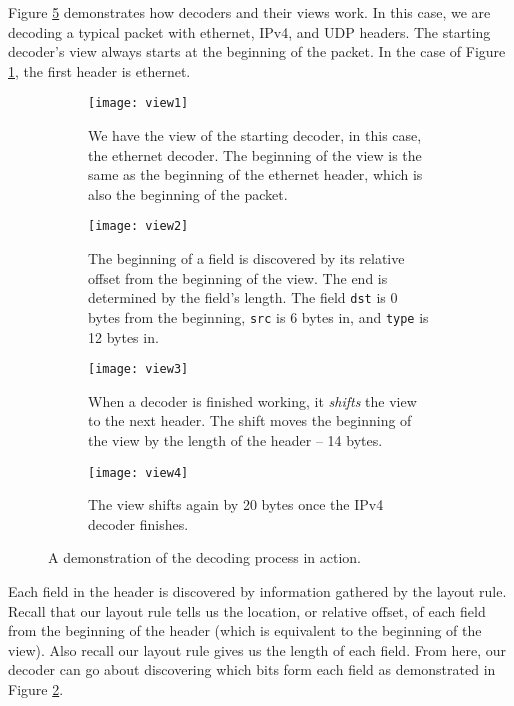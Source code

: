 Figure \ref{fg:decoding} demonstrates how decoders and their views work. In this case, we are decoding a typical packet with ethernet, IPv4, and UDP headers. The starting decoder's view always starts at the beginning of the packet. In the case of Figure \ref{fg:view1}, the first header is ethernet.

\begin{figure}[ht]
\begin{subfigure}[t]{.45\textwidth}
  \centering
  \texttt{[image: view1]}
  \caption{We have the view of the starting decoder, in this case, the ethernet decoder. The beginning of the view is the same as the beginning of the ethernet header, which is also the beginning of the packet.}
  \label{fg:view1}
\end{subfigure}%
\hfill
\begin{subfigure}[t]{.45\textwidth}
  \centering
  \texttt{[image: view2]}
  \caption{The beginning of a field is discovered by its relative offset from the beginning of the view. The end is determined by the field's length. The field \texttt{dst} is 0 bytes from the beginning, \texttt{src} is 6 bytes in, and \texttt{type} is 12 bytes in.}
  \label{fg:view2}
\end{subfigure}

\begin{subfigure}[t]{.45\textwidth}
  \centering
  \texttt{[image: view3]}
  \caption{When a decoder is finished working, it \textit{shifts} the view to the next header. The shift moves the beginning of the view by the length of the header -- 14 bytes.}
  \label{fg:view3}
\end{subfigure}%
\hfill
\begin{subfigure}[t]{.45\textwidth}
  \centering
  \texttt{[image: view4]}
  \caption{The view shifts again by 20 bytes once the IPv4 decoder finishes.}
  \label{fg:view4}
\end{subfigure}
\caption{A demonstration of the decoding process in action.}
\label{fg:decoding}
\end{figure}

Each field in the header is discovered by information gathered by the layout rule. Recall that our layout rule tells us the location, or relative offset, of each field from the beginning of the header (which is equivalent to the beginning of the view). Also recall our layout rule gives us the length of each field. From here, our decoder can go about discovering which bits form each field as demonstrated in Figure \ref{fg:view2}.


